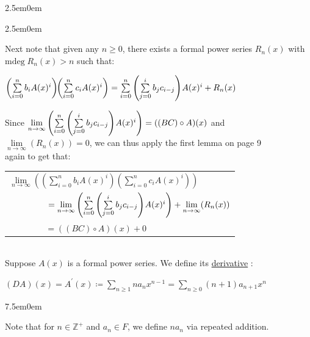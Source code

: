 \documentclass{book}
\newcommand{\teachComment}{
   \color{Orange}%
   \fontsize{12}{14}\selectfont%
}
\newcommand{\exPP}{%
   \color{RedViolet}%
   \fontsize{12}{14}\selectfont%
}
\newenvironment{myIndent}{%
   \begin{adjustwidth}{2.5em}{0em}%
}{%
   \end{adjustwidth}%
}
\newenvironment{myTindent}{%
   \begin{adjustwidth}{7.5em}{0em}%
}{%
   \end{adjustwidth}%
}
\newcommand{\udefine}[1]{{%
   \setulcolor{Red}%
   \setul{0.14em}{0.07em}%
   \ul{#1}%
}}
\newcommand{\mdeg}{\mathrm{mdeg}\phantom{.}}
\newcommand{\mySepTwo}[1][.]{%
   {\noindent\color{#1}{\rule{6.5in}{0.5mm}}}\\%
}
\newcommand{\retTwo}{\hfill\bigbreak}
\begin{document}
\begin{myIndent}
\begin{itemize}
\begin{myIndent}
         Next note that given any $n \geq 0$, there exists a formal power series $R_n(x)$ with $\mdeg R_n(x) > n$ such that:
         
         {\centering$\left(\sum\limits_{i = 0}^n b_iA(x)^i\right)\hspace{-0.3em}\left(\sum\limits_{i = 0}^n c_iA(x)^i\right) = \sum\limits_{i = 0}^n \left(\sum\limits_{j = 0}^i b_jc_{i-j}\right)\hspace{-0.1em}A(x)^i + R_n(x)$\retTwo\par}

         Since $\lim\limits_{n \rightarrow \infty}\left(\sum\limits_{i = 0}^n \left(\sum\limits_{j = 0}^i b_jc_{i-j}\right)\hspace{-0.1em}A(x)^i\right) = ((BC) \circ A)(x)$ and\\ $\lim\limits_{n \rightarrow \infty}(R_n(x)) = 0$, we can thus apply the first lemma on page 9\\ [4pt] again to get that:

         {\centering\exPP 
         \begin{tabular}{l}
            $\lim\limits_{n \rightarrow \infty}\left(\left(\sum\limits_{i = 0}^n b_iA(x)^i\right)\left(\sum\limits_{i = 0}^n c_iA(x)^i\right)\right)$ \\ [12pt]
            $\phantom{aaaaaaaa} = \lim\limits_{n \rightarrow \infty}\left(\sum\limits_{i = 0}^n \left(\sum\limits_{j = 0}^i b_jc_{i-j}\right)\hspace{-0.1em}A(x)^i\right) + \lim\limits_{n \rightarrow \infty}(R_n(x))$\\ [16pt]
            $\phantom{aaaaaaaa} = ((BC) \circ A)(x) + 0$
         \end{tabular} \retTwo\par}
      \end{myIndent}
   \end{itemize}
\end{myIndent}

\mySepTwo

Suppose $A(x)$ is a formal power series. We define its \udefine{derivative}:

{\centering $(DA)(x) = A^\prime(x) \coloneq \sum\limits_{n \geq 1}n a_n x^{n - 1} = \sum\limits_{n \geq 0}(n + 1)a_{n + 1}x^n $\par}

\begin{myTindent}\teachComment
   Note that for $n \in \mathbb{Z}^+$ and $a_n \in F$, we define $n a_n$ via repeated addition.\retTwo
\end{myTindent}
\end{document}
